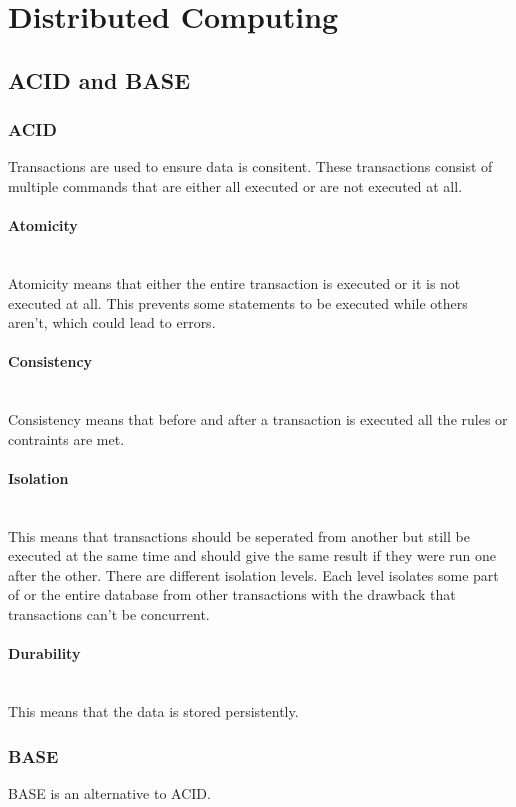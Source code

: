 \section{Distributed Computing}
\subsection{ACID and BASE}
\subsubsection{ACID}
Transactions are used to ensure data is consitent.
These transactions consist of multiple commands that are either all executed or are not executed at all.

\paragraph{Atomicity} \mbox{}\\
Atomicity means that either the entire transaction is executed or it is not executed at all.
This prevents some statements to be executed while others aren't, which could lead to errors.

\paragraph{Consistency} \mbox{}\\
Consistency means that before and after a transaction is executed all the rules or contraints are met.

\paragraph{Isolation} \mbox{}\\
This means that transactions should be seperated from another but still be executed at the same time and should give the same result if they were run one after the other.
There are different isolation levels. Each level isolates some part of or the entire database from other transactions with the drawback that transactions can't be concurrent.

\paragraph{Durability} \mbox{}\\
This means that the data is stored persistently.

\subsubsection{BASE}
BASE is an alternative to ACID.

